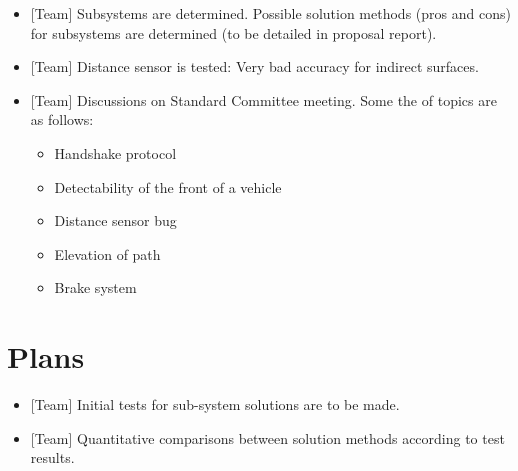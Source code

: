 \documentclass[a4paper,12pt]{article}
\begin{document}
\begin{itemize}
\item {[Team]} Subsystems  are determined. Possible solution methods (pros and cons) for subsystems are determined (to be detailed in proposal report).
\item {[Team]} Distance sensor is tested: Very bad accuracy for indirect surfaces.
\item {[Team]} Discussions on Standard Committee meeting. Some the of topics are as follows:
\begin{itemize}
	\item Handshake protocol
	\item Detectability of the front of a vehicle
	\item Distance sensor bug 
	\item Elevation of path
	\item Brake system
\end{itemize}
\end{itemize}

\section{Plans}

\begin{itemize}
	\item  {[Team]} Initial tests for sub-system solutions are to be made.
	\item  {[Team]} Quantitative comparisons between solution methods according to test results.
	
	
\end{itemize}



	


\end{document}
